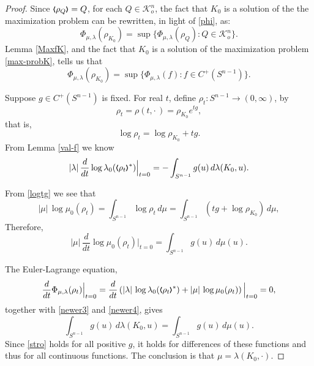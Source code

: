 \documentclass{cpamart1}     %
\theoremstyle{definition}
\theoremstyle{remark}
\newcommand{\sn}{S^{n-1}}
\newcommand{\kno}{\mathcal K^n_o}
\newcommand{\ee}{\mathcal E}
\newcommand{\bla}{\raise.2ex\hbox{$\scriptstyle\pmb \langle$}}
\newcommand{\bra}{\raise.2ex\hbox{$\scriptstyle\pmb \rangle$}}
\begin{document}
\begin{proof}
Since $\bla \rho_Q\bra = Q$, for each $Q\in\kno$,
the fact that $K_0$ is a solution of the
the maximization problem
 can be rewritten, in light of \eqref{phi}, as:
\begin{equation}\label{max-probK}
\Phi_{\mu,\lambda}(\rho_{K_0}) =\sup\{\Phi_{\mu,\lambda}(\rho_Q) : Q\in \kno \}.
\end{equation}
Lemma \ref{MaxfK}, and the fact that $K_0$ is a solution of the maximization problem
\eqref{max-probK}, tells us that
\[
\Phi_{\mu,\lambda}(\rho_{K_0}) =\sup\{\Phi_{\mu,\lambda}(f) : f\in C^+(\sn) \}.
\]

Suppose $g\in C^+(\sn)$ is fixed. For real $t$, define $\rho_t:\sn\to(0,\infty)$, by
\[
\rho_t=\rho(t, \cdot\,) = \rho_{K_0} e^{t g},
\]
that is,
\begin{equation}\label{logtg}
\log \rho_t = \log\rho_{K_0} + tg.
\end{equation}
From Lemma \ref{val-f} we know
\begin{equation}\label{newer3}
|\lambda|\,\frac{d}{dt} \log\lambda_0(\bla \rho_t\bra^*)\Big|_{t=0}
= -\int_{\sn} g(u)\, d\lambda(K_0,u).
\end{equation}

From \eqref{logtg} we see that
\begin{equation*}
|\mu|\,\log\mu_0(\rho_t)
= \int_{\sn} \log \rho_t\, d\mu =
\int_{\sn} (tg +\log \rho_{K_0})\, d\mu,
\end{equation*}
Therefore,
\begin{equation}\label{newer4}
|\mu|\,\frac{d}{dt} \log\mu_0(\rho_t)\Big|_{t=0}
 = \int_{\sn} g(u) \, d\mu(u).
\end{equation}

The Euler-Lagrange equation,
\[
\frac{d}{dt} \Phi_{\mu,\lambda}(\rho_t)\Big|_{t=0}
= \frac{d}{dt}\left( |\lambda|\,\log\lambda_0(\bla \rho_t\bra^*)
+ |\mu|\,\log \mu_0(\rho_t)\right)\Big|_{t=0} =0,
\]
together with \eqref{newer3} and \eqref{newer4}, gives
\begin{equation}\label{stro}
\int_{\sn} g(u)\, d\lambda(K_0,u) = \int_{\sn} g(u)\, d\mu(u).
\end{equation}
Since \eqref{stro} holds for all positive $g$, it holds for differences of these functions
and thus for all continuous functions. The conclusion is that $\mu = \lambda(K_0,\cdot)$.
\end{proof}
\end{document}

